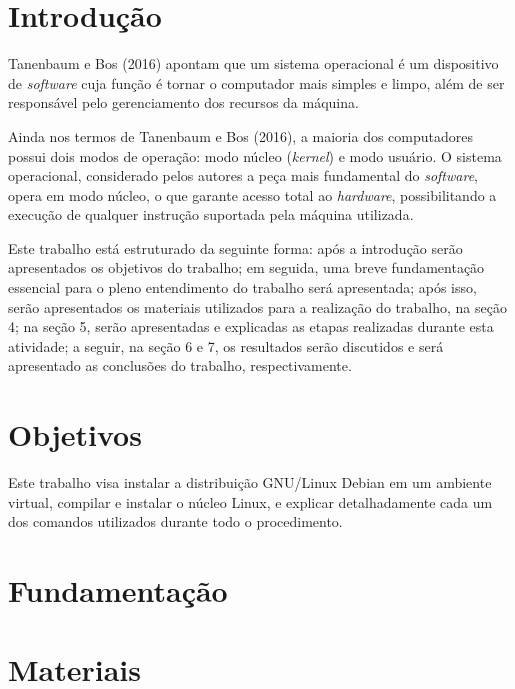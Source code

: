 \documentclass[
	12pt,				%
	oneside,   	        %
	a4paper,			%
	english,			%
	french,				%
	spanish,			%
	brazil,				%
	]{pacotes/abntex2}
\begin{document}
\makeatletter
\renewcommand{\chapter}{\@gobbletwo}
\makeatother

\section{Introdução}
\label{sec:introducao}
Tanenbaum e Bos (2016) apontam que um sistema operacional é um dispositivo de \textit{software} cuja função é tornar o computador mais simples e limpo, além de ser responsável pelo gerenciamento dos recursos da máquina.

Ainda nos termos de Tanenbaum e Bos (2016), a maioria dos computadores possui dois modos de operação: modo núcleo (\textit{kernel}) e modo usuário. O sistema operacional, considerado pelos autores a peça mais fundamental do \textit{software}, opera em modo núcleo, o que garante acesso total ao \textit{hardware}, possibilitando a execução de qualquer instrução suportada pela máquina utilizada.

Este trabalho está estruturado da seguinte forma: após a introdução serão apresentados os objetivos do trabalho; em seguida, uma breve fundamentação essencial para o pleno entendimento do trabalho será apresentada; após isso, serão apresentados os materiais utilizados para a realização do trabalho, na seção 4; na seção 5, serão apresentadas e explicadas as etapas realizadas durante esta atividade; a seguir, na seção 6 e 7, os resultados serão discutidos e será apresentado as conclusões do trabalho, respectivamente.



\section{Objetivos}
\label{sec:objetivos}

Este trabalho visa instalar a distribuição GNU/Linux Debian em um ambiente virtual, compilar e instalar o núcleo Linux, e explicar detalhadamente cada um dos comandos utilizados durante todo o procedimento.

\section{Fundamentação}
\label{sec:fundamentacao}


\section{Materiais}
\label{sec:materiais}
\end{document}

